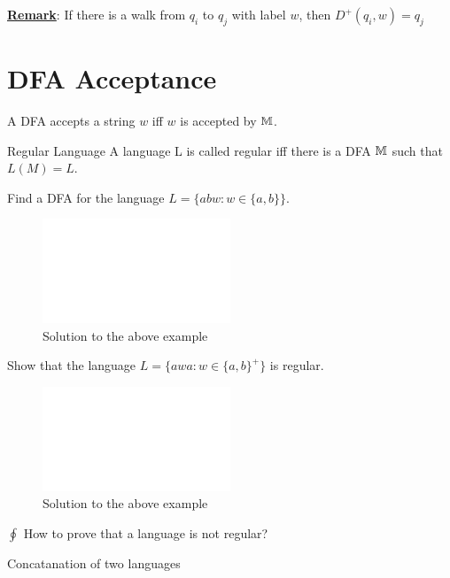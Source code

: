 \textbf{\underline{Remark}}: If there is a walk from $q_i$ to $q_j$ with label $w$, then $D^{+}(q_i, w) = q_j$

\section{DFA Acceptance}

\begin{definition}{}
    A DFA accepts a string $w$ iff $w$ is accepted by $\mathbb{M}$.
\end{definition}

\begin{definition}{Regular Language}
    A language L is called regular iff there is a DFA $\mathbb{M}$ such that $L(M) = L$.
\end{definition}

\begin{example}
    Find a DFA for the language $L = \{abw : w \in \{a, b\} \}$.
\end{example}

\begin{figure}[!h]
    \centering
    \includegraphics[width=0.5\textwidth]{figures/default.png}
    \caption{Solution to the above example}
\end{figure}

\begin{example}
    Show that the language $L = \{awa : w \in \{a, b\}^{+} \}$ is regular.
\end{example}

\begin{figure}[!h]
    \centering
    \includegraphics[width=0.5\textwidth]{figures/default.png}
    \caption{Solution to the above example}
\end{figure}

$\oint$ How to prove that a language is not regular?

\begin{definition}{Concatanation of two languages}
    
\end{definition}